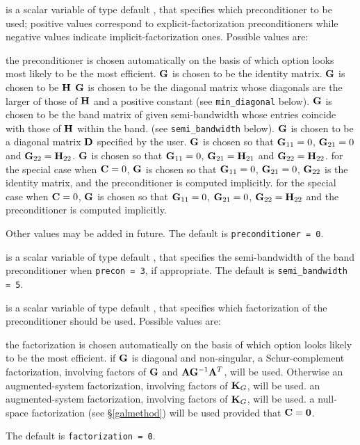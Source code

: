 \documentclass{galahad}
\begin{document}
\begin{description}
 is a scalar variable of type default \integer,
that specifies which preconditioner to be used;
positive values correspond to explicit-factorization preconditioners
while negative values indicate implicit-factorization ones. Possible values are:

\begin{description}
 the preconditioner is chosen automatically on the basis of which option
        looks most likely to be the most efficient.
 ${\mathbf{G}}$ is chosen to be the identity matrix.
 ${\mathbf{G}}$ is chosen to be ${\mathbf{H}}$
 ${\mathbf{G}}$ is chosen to be the diagonal matrix whose diagonals
        are the larger of those of ${\mathbf{H}}$ and a positive constant
        (see {\tt min\_diagonal} below).
 ${\mathbf{G}}$ is chosen to be the band matrix of given semi-bandwidth
        whose entries coincide with those of ${\mathbf{H}}$ within the band.
        (see {\tt semi\_bandwidth} below).
 ${\mathbf{G}}$ is chosen to be a diagonal matrix ${\mathbf{D}}$ specified by the
        user.
 ${\mathbf{G}}$ is chosen so that ${\mathbf{G}}_{11} = 0$, ${\mathbf{G}}_{21} = 0$
        and ${\mathbf{G}}_{22} = {\mathbf{H}}_{22}$.
 ${\mathbf{G}}$ is chosen so that ${\mathbf{G}}_{11} = 0$, ${\mathbf{G}}_{21} = {\mathbf{H}}_{21}$
        and ${\mathbf{G}}_{22} = {\mathbf{H}}_{22}$.
 for the special case when ${\mathbf{C}} = 0$,
        ${\mathbf{G}}$ is chosen so that ${\mathbf{G}}_{11} = 0$, ${\mathbf{G}}_{21} = 0$,
        ${\mathbf{G}}_{22}$ is the identity matrix, and the preconditioner is computed
        implicitly.
 for the special case when ${\mathbf{C}} = 0$,
        ${\mathbf{G}}$ is chosen so that ${\mathbf{G}}_{11} = 0$, ${\mathbf{G}}_{21} = 0$,
        ${\mathbf{G}}_{22} = {\mathbf{H}}_{22}$ and the preconditioner is computed
        implicitly.
\end{description}
Other values may be added in future.
The default is {\tt preconditioner = 0}.

 is a scalar variable of type default \integer, that
specifies the semi-bandwidth of the band preconditioner when {\tt precon = 3},
if appropriate.
The default is {\tt semi\_bandwidth = 5}.

 is a scalar variable of type default \integer, that
specifies which factorization of the preconditioner should be used.
Possible values are:

\begin{description}
 the factorization is chosen automatically on the basis of which option
        looks likely to be the most efficient.
 if ${\mathbf{G}}$ is diagonal and non-singular, a Schur-complement
        factorization, involving factors of ${\mathbf{G}}$ and ${\mathbf{A}} {\mathbf{G}}^{-1} {\mathbf{A}}^T$,
        will be used. Otherwise an augmented-system factorization, involving
        factors of ${\mathbf{K}}_G$, will be used.
 an augmented-system factorization, involving factors of ${\mathbf{K}}_G$,
        will be used.
 a null-space factorization (see \S\ref{galmethod}) will be used
provided that ${\mathbf{C}} = {\mathbf{0}}$.
\end{description}
The default is {\tt factorization = 0}.


\end{description}
\end{document}
